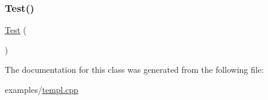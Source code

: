 \subsubsection{\texorpdfstring{Test()}{Test()}}
{\footnotesize\ttfamily \hyperlink{class_test}{Test} (\begin{DoxyParamCaption}{ }\end{DoxyParamCaption})}



The documentation for this class was generated from the following file\+:\begin{DoxyCompactItemize}
\item 
examples/\hyperlink{templ_8cpp}{templ.\+cpp}\end{DoxyCompactItemize}
